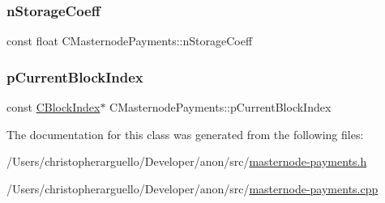 \subsubsection{\texorpdfstring{n\+Storage\+Coeff}{nStorageCoeff}}
{\footnotesize\ttfamily const float C\+Masternode\+Payments\+::n\+Storage\+Coeff\hspace{0.3cm}{\ttfamily [private]}}

\mbox{\label{class_c_masternode_payments_ac0198d421f1ce64bc8da825f08b60b30}} 
\subsubsection{\texorpdfstring{p\+Current\+Block\+Index}{pCurrentBlockIndex}}
{\footnotesize\ttfamily const \mbox{\hyperlink{class_c_block_index}{C\+Block\+Index}}$\ast$ C\+Masternode\+Payments\+::p\+Current\+Block\+Index\hspace{0.3cm}{\ttfamily [private]}}



The documentation for this class was generated from the following files\+:\begin{DoxyCompactItemize}
\item 
/\+Users/christopherarguello/\+Developer/anon/src/\mbox{\hyperlink{masternode-payments_8h}{masternode-\/payments.\+h}}\item 
/\+Users/christopherarguello/\+Developer/anon/src/\mbox{\hyperlink{masternode-payments_8cpp}{masternode-\/payments.\+cpp}}\end{DoxyCompactItemize}
